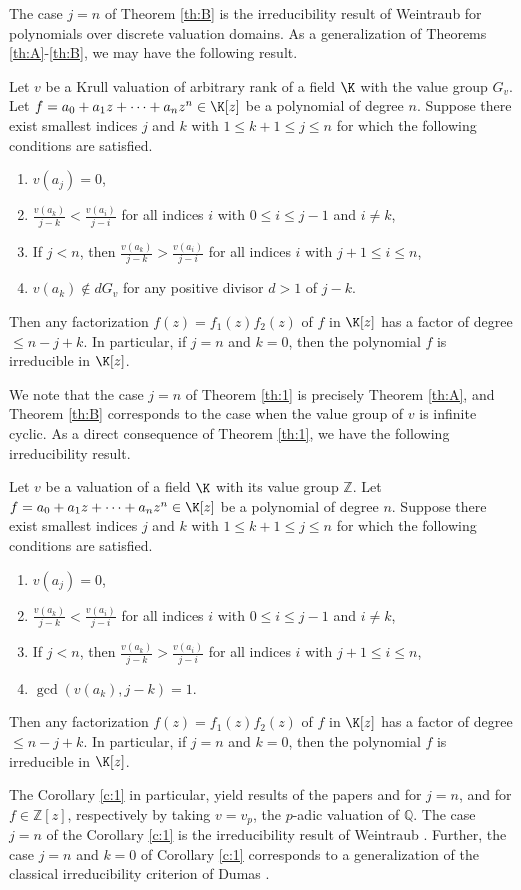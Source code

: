 \documentclass[12pt]{amsart}%
\begin{document}
The case  $j=n$ of Theorem \ref{th:B} is the irreducibility result of Weintraub \cite{W} for polynomials over discrete valuation domains. As a generalization of Theorems \ref{th:A}-\ref{th:B}, we may have the following  result.
\begin{theorem}\label{th:1}
Let $v$ be a Krull valuation of arbitrary rank of a field $\K$ with the value group $G_v$. Let $f=a_0+a_1 z+\cdots+a_n z^n \in \K[z]$ be a polynomial of degree $n$. Suppose there exist smallest indices $j$ and $k$ with $1\leq k+1\leq j\leq n$ for which the following conditions are satisfied.
\begin{enumerate}[label=$(\roman*)$]
		\item[$(i)$] $v(a_j)=0$,
\item[$(ii)$] $\frac{v(a_k)}{j-k}<\frac{v(a_i)}{j-i}$ for all indices $i$ with $0\leq i\leq j-1$ and $i\neq k$,
\item[(iii)] If $j<n$, then $\frac{v(a_k)}{j-k}>\frac{v(a_i)}{j-i}$ for all indices $i$ with $j+1\leq i\leq n$,
\item[$(iv)$] $v(a_k)\notin dG_v$ for any positive divisor $d>1$ of $j-k$.
	\end{enumerate}
Then any factorization $f(z)=f_1(z)f_2(z)$ of $f$ in $\K[z]$ has a factor of degree $\leq n-j+k$. In particular, if $j=n$ and $k=0$, then the polynomial $f$ is irreducible in $\K[z]$.
\end{theorem}
We note that the case $j=n$ of Theorem \ref{th:1} is precisely Theorem \ref{th:A}, and Theorem \ref{th:B} corresponds to the case when the value group of $v$ is infinite cyclic. As a direct consequence of Theorem \ref{th:1}, we have the following irreducibility result.
\begin{corollary}\label{c:1}
Let $v$ be a valuation of a field $\K$ with its value group $\mathbb{Z}$. Let $f=a_0+a_1z+\cdots +a_nz^n \in \K[z]$ be a polynomial of degree $n$. Suppose there exist smallest indices $j$ and $k$ with $1\leq k+1\leq j\leq n$ for which the following conditions are satisfied.
	\begin{enumerate}[label=$(\roman*)$]
		\item $v(a_j)=0$,
		\item $\frac{v(a_k)}{j-k}<\frac{v(a_i)}{j-i}$ for all indices $i$ with $0\leq i\leq j-1$ and $i\neq k$,
		\item If $j<n$, then $\frac{v(a_k)}{j-k}>\frac{v(a_i)}{j-i}$ for all indices $i$ with $j+1\leq i\leq n$,
		\item $\gcd(v(a_k),j-k)=1$.
	\end{enumerate}	
	Then any factorization $f(z)=f_1(z)f_2(z)$ of $f$ in $\K[z]$ has a factor of degree $\leq n-j+k$. In particular, if $j=n$ and $k=0$, then the polynomial $f$ is irreducible in $\K[z]$.
\end{corollary}
The Corollary \ref{c:1} in particular, yield results of  the papers \cite[Corollary 1.3]{JK} and \cite[Theorem 1]{JRG2} for $j=n$, and for $f\in \mathbb{Z}[z]$, respectively by taking $v=v_p$, the $p$-adic valuation of $\mathbb{Q}$. The case $j=n$ of the  Corollary \ref{c:1} is the irreducibility result of Weintraub \cite{W}. Further, the case $j=n$ and $k=0$ of Corollary \ref{c:1} corresponds to a generalization of the classical irreducibility criterion of Dumas \cite{D}.
\end{document}
